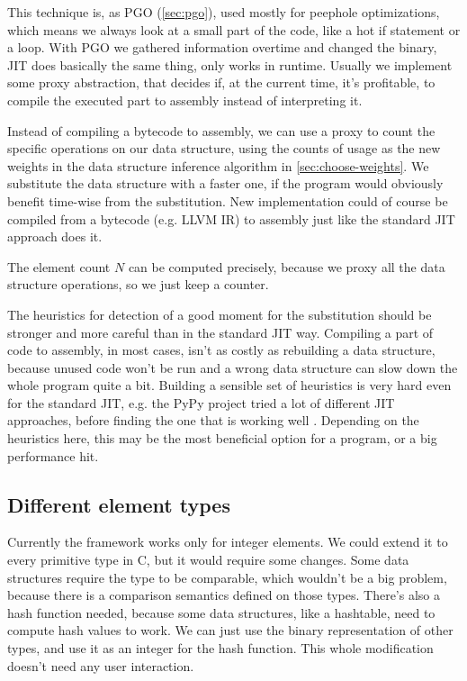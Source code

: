 \documentclass[a4paper,11pt]{article}
\begin{document}
            This technique is, as PGO (\autoref{sec:pgo}), used mostly for peephole optimizations, which means we always
            look at a small part of the code, like a hot if statement or a loop. With PGO we gathered information
            overtime and changed the binary, JIT does basically the same thing, only works in runtime. Usually we
            implement some proxy abstraction, that decides if, at the current time, it's profitable, to compile the
            executed part to assembly instead of interpreting it.

            Instead of compiling a bytecode to assembly, we can use a proxy to count the specific operations on our
            data structure, using the counts of usage as the new weights in the data structure inference algorithm in
            \autoref{sec:choose-weights}. We substitute the data structure with a faster one, if the program would
            obviously benefit time-wise from the substitution. New implementation could of course be compiled from a
            bytecode (e.g. LLVM IR) to assembly just like the standard JIT approach does it.

            The element count $N$ can be computed precisely, because we proxy all the data structure operations, so we
            just keep a counter.

            The heuristics for detection of a good moment for the substitution should be stronger and more careful than
            in the standard JIT way. Compiling a part of code to assembly, in most cases, isn't as costly as
            rebuilding a data structure, because unused code won't be run and a wrong data structure can slow down the
            whole program quite a bit. Building a sensible set of heuristics is very hard even for the standard JIT,
            e.g. the PyPy project tried a lot of different JIT approaches, before finding the one that is working well \cite{PyPy}.
            Depending on the heuristics here, this may be the most beneficial option for a program, or a big performance
            hit.

	\subsection{Different element types}

		Currently the framework works only for integer elements. We could extend it to every primitive type in
		C, but it would require some changes.  Some data structures require the type to be comparable, which
		wouldn't be a big problem, because there is a comparison semantics defined on those types. There's also
		a hash function needed, because some data structures, like a hashtable, need to compute hash values to
		work. We can just use the binary representation of other types, and use it as an integer for the hash
		function. This whole modification doesn't need any user interaction.
\end{document}
